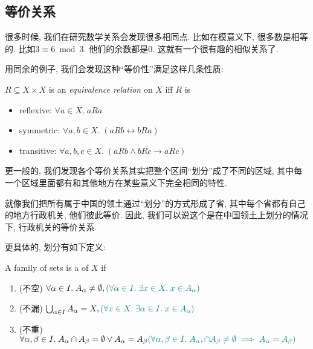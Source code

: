 \subsection{等价关系}

很多时候, 我们在研究数学关系会发现很多相同点. 比如在模意义下, 很多数是相等的. 比如$3 \equiv 6 \bmod 3$. 他们的余数都是$0$. 这就有一个很有趣的相似关系了. 

用同余的例子, 我们会发现这种``等价性''满足这样几条性质: 

\begin{definition}
  $R \subseteq X \times X$ is an {\it equivalence relation} on $X$ iff $R$ is
  \begin{itemize}
    \item reflexive: $\forall a \in X.\; a R a$
    \item symmetric: $\forall a, b \in X.\; (a R b \leftrightarrow b R a)$
    \item transitive: $\forall a, b, c \in X.\; (a R b \land b R c \to a R c)$
  \end{itemize}
\end{definition}

更一般的, 我们发现各个等价关系其实把整个区间``划分''成了不同的区域, 其中每一个区域里面都有和其他地方在某些意义下完全相同的特性. 

就像我们把所有属于中国的领土通过``划分''的方式形成了省, 其中每个省都有自己的地方行政机关, 他们彼此等价. 因此, 我们可以说这个是在中国领土上划分的情况下, 行政机关的等价关系. 

更具体的, 划分有如下定义: 

\begin{definition}[划分 (Partition)]
  A family of sets 
  is a  of $X$ if

  \begin{enumerate}
    \item (不空)
      $\forall \alpha \in I.\; A_{\alpha} \neq \emptyset,\textcolor{teal}{(\forall \alpha \in I.\; \exists x \in X.\; x \in A_{\alpha})}$
    \item (不漏)
      $\bigcup_{\alpha \in I} A_{\alpha} = X, \textcolor{teal}{(\forall x \in X.\; \exists \alpha \in I.\; x \in A_{\alpha})}$
    \item (不重)
      $
        \forall \alpha, \beta \in I.\; A_{\alpha} \cap A_{\beta} = \emptyset \lor A_{\alpha} = A_{\beta}
        \textcolor{teal}{(\forall \alpha, \beta \in I.\; A_{\alpha}, \cap A_{\beta} \neq \emptyset \implies A_{\alpha} = A_{\beta})}
      $
  \end{enumerate}
\end{definition}

